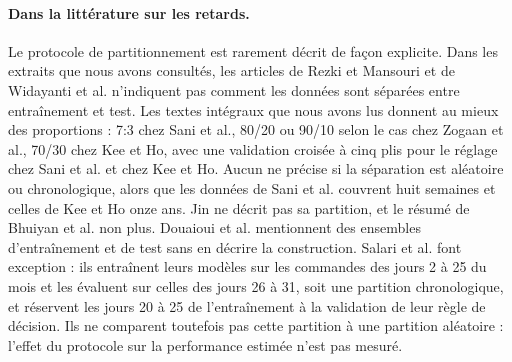 \documentclass[11pt,a4paper]{article}
\theoremstyle{definition}
\begin{document}
\paragraph{Dans la littérature sur les retards.} Le protocole de partitionnement est rarement décrit de façon explicite. Dans les extraits que nous avons consultés, les articles de Rezki et Mansouri et de Widayanti et al. n'indiquent pas comment les données sont séparées entre entraînement et test. Les textes intégraux que nous avons lus donnent au mieux des proportions : 7:3 chez Sani et al., 80/20 ou 90/10 selon le cas chez Zogaan et al., 70/30 chez Kee et Ho, avec une validation croisée à cinq plis pour le réglage chez Sani et al. et chez Kee et Ho. Aucun ne précise si la séparation est aléatoire ou chronologique, alors que les données de Sani et al. couvrent huit semaines et celles de Kee et Ho onze ans. Jin ne décrit pas sa partition, et le résumé de Bhuiyan et al. non plus. Douaioui et al. \cite{douaioui2024enhancing} mentionnent des ensembles d'entraînement et de test sans en décrire la construction. Salari et al. \cite{salari2022realtime} font exception : ils entraînent leurs modèles sur les commandes des jours 2 à 25 du mois et les évaluent sur celles des jours 26 à 31, soit une partition chronologique, et réservent les jours 20 à 25 de l'entraînement à la validation de leur règle de décision. Ils ne comparent toutefois pas cette partition à une partition aléatoire : l'effet du protocole sur la performance estimée n'est pas mesuré.
\end{document}
